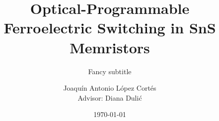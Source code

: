 \documentclass[aspectratio=169]{beamer}
\title{Optical-Programmable Ferroelectric Switching in SnS Memristors}
\subtitle{Fancy subtitle}
\author{Joaquín Antonio López Cortés\\Advisor: Diana Dulić}
\institute{Universidad de Chile\\Departamento de Ingeniería Eléctrica}
\date{\today}
\begin{document}
\begin{frame}[plain]
  \titlepage
\end{frame}
\end{document}
